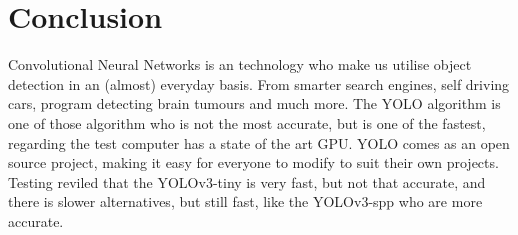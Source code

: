 \newpage

\section{Conclusion}
Convolutional Neural Networks is an technology who make us utilise object detection in an (almost) everyday basis. From smarter search engines, self driving cars, program detecting brain tumours and much more. The YOLO algorithm is one of those algorithm who is not the most accurate, but is one of the fastest, regarding the test computer has a state of the art GPU. YOLO comes as an open source project, making it easy for everyone to modify to suit their own projects. Testing reviled that the YOLOv3-tiny is very fast, but not that accurate, and there is slower alternatives, but still fast, like the YOLOv3-spp who are more accurate. 